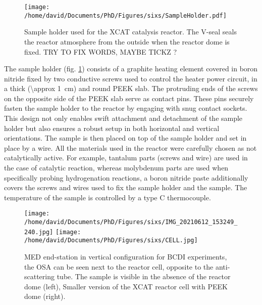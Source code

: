 \begin{figure}[!htb]
    \centering
    \texttt{[image: /home/david/Documents/PhD/Figures/sixs/SampleHolder.pdf]}
    \caption{
        Sample holder used for the XCAT catalysis reactor.
        The V-seal seals the reactor atmosphere from the outside when the reactor dome is fixed.
        TRY TO FIX WORDS, MAYBE TICKZ ?
    }
    \label{fig:SampleHolder}
\end{figure}

The sample holder (fig. \ref{fig:SampleHolder}) consists of a graphite heating element covered in boron nitride fixed by two conductive screws used to control the heater power circuit, in a thick (\qty{\approx 1}{\cm}) and round PEEK slab.
The protruding ends of the screws on the opposite side of the PEEK slab serve as contact pins.
These pins securely fasten the sample holder to the reactor by engaging with snug contact sockets.
This design not only enables swift attachment and detachment of the sample holder but also ensures a robust setup in both horizontal and vertical orientations.
The sample is then placed on top of the sample holder and set in place by a wire.
All the materials used in the reactor were carefully chosen as not catalytically active.
For example, tantalum parts (screws and wire) are used in the case of catalytic reaction, whereas molybdenum parts are used when specifically probing hydrogenation reactions, a boron nitride paste additionally covers the screws and wires used to fix the sample holder and the sample.
The temperature of the sample is controlled by a type C thermocouple.

\begin{figure}[!htb]
    \centering
    \texttt{[image: /home/david/Documents/PhD/Figures/sixs/IMG\_20210612\_153249\_240.jpg]}
    \texttt{[image: /home/david/Documents/PhD/Figures/sixs/CELL.jpg]}
    \caption{
        MED end-station in vertical configuration for BCDI experiments, the OSA can be seen next to the reactor cell, opposite to the anti-scattering tube.
        The sample is visible in the absence of the reactor dome (left),
        Smaller version of the XCAT reactor cell with PEEK dome (right).
    }
    \label{fig:MEDV}
\end{figure}

